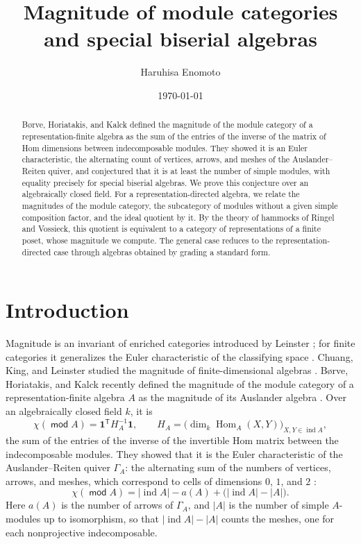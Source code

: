 \documentclass[a4paper,reqno,10pt]{amsart}
\title{Magnitude of module categories and special biserial algebras}
\author[H.\ Enomoto]{Haruhisa Enomoto}
\date{\today}
\theoremstyle{definition}
\numberwithin{equation}{section}
\DeclareMathOperator{\moduleCategory}{\mathsf{mod}}
\renewcommand{\mod}{\moduleCategory}
\DeclareMathOperator{\ind}{ind}
\DeclareMathOperator{\Hom}{Hom}
\newcommand{\one}{\mathbf 1}
\begin{document}
\begin{abstract}
B{\o}rve, Horiatakis, and Kalck defined the magnitude of the module
category of a representation-finite algebra as the sum of the entries of
the inverse of the matrix of Hom dimensions between indecomposable
modules. They showed it is an Euler characteristic, the alternating
count of vertices, arrows, and meshes of the Auslander--Reiten quiver,
and conjectured that it is at least the number of simple modules, with
equality precisely for special biserial algebras. We prove this
conjecture over an algebraically closed field. For a
representation-directed algebra, we relate the magnitudes of the module
category, the subcategory of modules without a given simple composition
factor, and the ideal quotient by it. By the theory of
hammocks of Ringel and Vossieck, this quotient is equivalent to a
category of representations of a finite poset, whose magnitude we
compute. The general case reduces to the representation-directed case through algebras obtained
by grading a standard form.
\end{abstract}
\maketitle
\setcounter{tocdepth}{1}
\tableofcontents

\section{Introduction}\label{sec:introduction}
Magnitude is an invariant of enriched categories introduced by Leinster
\cite[Section~1.3]{Lei13}; for finite categories it generalizes the Euler characteristic
of the classifying space \cite{Lei08}. Chuang, King, and Leinster studied the
magnitude of finite-dimensional algebras \cite{CKL}. B{\o}rve, Horiatakis,
and Kalck recently defined the magnitude of the module category of a
representation-finite algebra \(A\) as the magnitude of its Auslander
algebra \cite{BHK}. Over an algebraically closed field \(k\), it is
\[
 \chi(\mod A)=\one^{\mathsf T}H_A^{-1}\one,\qquad
 H_A=\bigl(\dim_k\Hom_A(X,Y)\bigr)_{X,Y\in\ind A},
\]
the sum of the entries of the inverse of the invertible Hom matrix between the
indecomposable modules. They showed that it is the Euler characteristic of
the Auslander--Reiten quiver \(\Gamma_A\): the alternating sum of the
numbers of vertices, arrows, and meshes, which correspond to cells of
dimensions \(0\), \(1\), and \(2\) \cite[Lemma~1.9]{BHK}:
\begin{equation}\label{eq:intro-count}
 \chi(\mod A)=|\ind A|-a(A)+\bigl(|\ind A|-|A|\bigr).
\end{equation}
Here \(a(A)\) is the number of arrows of \(\Gamma_A\), and \(|A|\) is the
number of simple \(A\)-modules up to isomorphism, so that
\(|\ind A|-|A|\) counts the meshes, one for each nonprojective
indecomposable.
\end{document}
